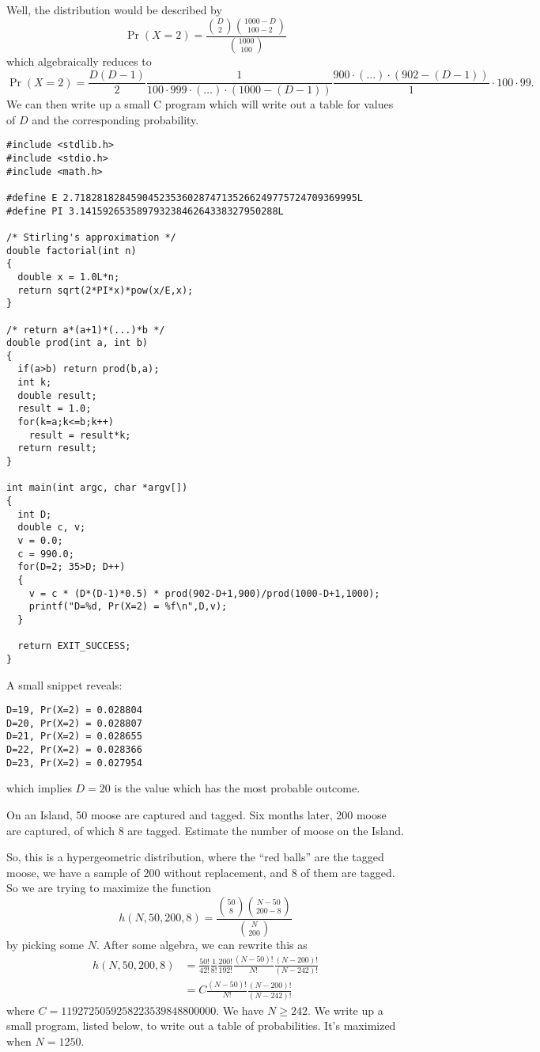Well, the distribution would be described by
\begin{equation}
\Pr(X=2)=\frac{\binom{D}{2}\binom{1000-D}{100-2}}{\binom{1000}{100}}
\end{equation}
which algebraically reduces to
\begin{equation}
\Pr(X=2)=\frac{D(D-1)}{2}\frac{1}{100\cdot999\cdot(\dots)\cdot(1000-(D-1))}
\frac{900\cdot(\dots)\cdot(902-(D-1))}{1}\cdot100\cdot99.
\end{equation}
We can then write up a small C program which will write out a table for
values of $D$ and the corresponding probability.
\begin{lstlisting}
#include <stdlib.h>
#include <stdio.h>
#include <math.h>

#define E 2.71828182845904523536028747135266249775724709369995L
#define PI 3.14159265358979323846264338327950288L

/* Stirling's approximation */
double factorial(int n)
{
  double x = 1.0L*n;
  return sqrt(2*PI*x)*pow(x/E,x);
}

/* return a*(a+1)*(...)*b */
double prod(int a, int b)
{
  if(a>b) return prod(b,a);
  int k;
  double result;
  result = 1.0;
  for(k=a;k<=b;k++)
    result = result*k;
  return result;
}

int main(int argc, char *argv[])
{
  int D;
  double c, v;
  v = 0.0;
  c = 990.0;
  for(D=2; 35>D; D++)
  {
    v = c * (D*(D-1)*0.5) * prod(902-D+1,900)/prod(1000-D+1,1000);
    printf("D=%d, Pr(X=2) = %f\n",D,v);
  }

  return EXIT_SUCCESS;
}
\end{lstlisting}
A small snippet reveals:
\begin{Verbatim}[fontsize=\footnotesize]
D=19, Pr(X=2) = 0.028804
D=20, Pr(X=2) = 0.028807
D=21, Pr(X=2) = 0.028655
D=22, Pr(X=2) = 0.028366
D=23, Pr(X=2) = 0.027954
\end{Verbatim}
which implies $D=20$ is the value which has the most probable outcome.


On an Island, 50 moose are captured and tagged. Six months later, 200
moose are captured, of which 8 are tagged. Estimate the number of moose
on the Island.

So, this is a hypergeometric distribution, where the ``red balls'' are
the tagged moose, we have a sample of 200 without replacement, and 8 of
them are tagged. So we are trying to maximize the function
\begin{equation}
h(N,50,200,8)=\frac{\binom{50}{8}\binom{N-50}{200-8}}{\binom{N}{200}}
\end{equation}
by picking some $N$. After some algebra, we can rewrite this as
\begin{equation}
\begin{split}
h(N,50,200,8)&=\frac{50!}{42!}\frac{1}{8!}\frac{200!}{192!}\frac{(N-50)!}{N!}\frac{(N-200)!}{(N-242)!}\\
&=C\frac{(N-50)!}{N!}\frac{(N-200)!}{(N-242)!}
\end{split}
\end{equation}
where $C=1192725059258223539848800000$. 
We have $N\geq242$. We write up a small program, listed below, to write
out a table of probabilities. It's maximized when $N=1250$.

